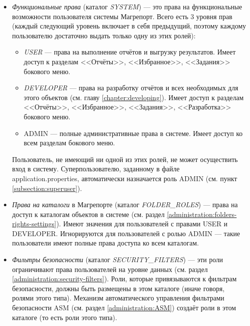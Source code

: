 \documentclass[../user-manual.tex]{subfiles}
\begin{document}
	\begin{itemize}
		\item \textit{Функциональные права} (каталог \textit{SYSTEM}) --- это права на функциональные возможности пользователя системы Магрепорт. Всего есть 3 уровня прав (каждый следующий уровень включает в себя предыдущий, поэтому каждому пользователю достаточно выдать только одну из этих ролей):
		
			\begin{itemize}
				\item \textit{USER} --- права на выполнение отчётов и выгрузку результатов. Имеет доступ к разделам <<Отчёты>>, <<Избранное>>, <<Задания>> бокового меню.
				
				\item \textit{DEVELOPER} --- права на разработку отчётов и всех необходимых для этого объектов (см. главу \ref{chapter:developing}). Имеет доступ к разделам <<Отчёты>>, <<Избранное>>, <<Задания>>, <<Разработка>> бокового меню.
				
				\item ADMIN --- полные административные права в системе. Имеет доступ ко всем разделам бокового меню.
			\end{itemize}
		
		Пользователь, не имеющий ни одной из этих ролей, не может осуществить вход в систему. Суперпользователю, заданному в файле application.properties, автоматически назначается роль ADMIN (см. пункт \ref{subsection:superuser}).
		
		\item \textit{Права на каталоги} в Магрепорте (каталог \textit{FOLDER\_ROLES}) --- права на доступ к каталогам объектов в системе (см. раздел \ref{administration:folders-rights-settings}). Имеют значения для пользователей с правами USER и DEVELOPER. Игнорируются для пользователей с ролью ADMIN --- такие пользователи имеют полные права доступа ко всем каталогам.
		
		\item \textit{Фильтры безопасности} (каталог \textit{SECURITY\_FILTERS}) --- эти роли ограничивают права пользователей на уровне данных (см. раздел \ref{administration:security-filters}). Роли, которые привязываются к фильтрам безопасности, должны быть размещены в этом каталоге (иначе говоря, ролями этого типа). Механизм автоматического управления фильтрами безопасности ASM (см. раздел \ref{administration:ASM}) создаёт роли в этом каталоге (то есть роли этого типа).
	\end{itemize}
	
\end{document}
